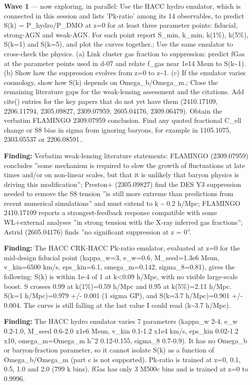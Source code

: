 \documentclass[11pt,a4paper]{article}
\begin{document}
\textbf{Wave 1} --- now exploring, in parallel: Use the HACC hydro emulator, which is connected in this session and lists 'Pk-ratio' among its 14 observables, to predict S(k) = P\_hydro/P\_DMO at z=0 for at least three parameter points: fiducial, strong-AGN and weak-AGN. For each point report S\_min, k\_min, k(1\%), k(5\%), S(k=1) and S(k=5), and plot the curves together.; Use the same emulator to cross-check the physics. (a) Link cluster gas fraction to suppression: predict fGas at the parameter points used in d-07 and relate f\_gas near 1e14 Msun to S(k\textasciitilde{}1). (b) Show how the suppression evolves from z=0 to z\textasciitilde{}1. (c) If the emulator varies cosmology, show how S(k) depends on Omega\_b/Omega\_m.; Close the remaining literature gaps for the weak-lensing assessment and the citations. Add cite() entries for the key papers that do not yet have them (2410.17109, 2206.11794, 2305.09827, 2309.07959, 2605.04176, 2309.06479). Obtain the verbatim FLAMINGO 2309.07959 conclusion. Find any quoted fractional C\_ell change or S8 bias in sigma from ignoring baryons, for example in 1105.1075, 2303.05537 or 2206.08591..

\textbf{Finding:} Verbatim weak-lensing literature statements: FLAMINGO (2309.07959) concludes ''some mechanism is required to slow the growth of fluctuations at late times and/or on non-linear scales, but that it is unlikely that baryon physics is driving this modification''; Preston+ (2305.09827) find the DES Y3 suppression needed to remove the S8 tension ''is still more extreme than predictions from recent numerical simulations'' and must extend to k \textasciitilde{} 0.2 h/Mpc; FLAMINGO 2410.17109 reports a strongest-feedback response compatible with some WL+external analyses ''in strong tension with the X-ray inferred gas fractions''; Astrid (2605.04176) finds ''no significant suppression at z = 0''.

\textbf{Finding:} The HACC CRK-HACC Pk-ratio emulator, evaluated at z=0 for the mid-design fiducial point (kappa\_w=3, e\_w=0.6, M\_seed=1.3e6 Msun, v\_kin=6500 km/s, eps\_kin=6.1, omega\_m=0.142, sigma\_8=0.81), gives the following: S(k) is within 1e-4 of 1 at k\textless{}0.09 h/Mpc, with no visible large-scale boost. S crosses 0.99 at k(1\%)=0.59 h/Mpc and 0.95 at k(5\%)=2.11 h/Mpc. S(k=1 h/Mpc)=0.979 +/- 0.001 (1 sigma GP), and S(k=3.7 h/Mpc)=0.901 +/- 0.004. The curve is still falling at the last value I could read (k\textasciitilde{}3.7 h/Mpc).

\textbf{Finding:} The HACC hydro emulator varies 7 parameters (kappa\_w 2-4, e\_w 0.2-1.0, M\_seed 0.6-2.0 x1e6 Msun, v\_kin 0.1-1.2 x1e4 km/s, eps\_kin 0.02-1.2 x10, omega\_m=Omega\_m h\textasciicircum{}2 0.12-0.155, sigma\_8 0.7-0.9). It has no Omega\_b or baryon-fraction parameter, so it cannot isolate S(k) as a function of Omega\_b/Omega\_m (part c is not supported). Pk-ratio is trained at z=0, 0.1, 0.5, 1.0 and 2.0 (799 k bins). fGas has only 3 M500c bins and is trained at z=0 to 0.9996.
\end{document}

